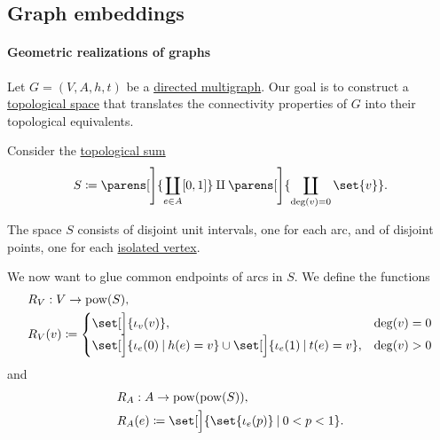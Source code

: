 \subsection{Graph embeddings}\label{subsec:graph_embeddings}

\paragraph{Geometric realizations of graphs}

\begin{definition}\label{def:graph_geometric_realization}\mimprovised
  Let \( G = (V, A, h, t) \) be a \hyperref[def:directed_multigraph]{directed multigraph}. Our goal is to construct a \hyperref[def:topological_space]{topological space} that translates the connectivity properties of \( G \) into their topological equivalents.

  Consider the \hyperref[def:topological_sum]{topological sum}
  \begin{equation*}
    S \coloneqq \parens[\Bigg]{ \coprod_{e \in A} [0, 1] } \amalg \parens[\Bigg]{ \coprod_{\deg(v) = 0} \set{ v } }.
  \end{equation*}

  The space \( S \) consists of disjoint unit intervals, one for each arc, and of disjoint points, one for each \hyperref[def:graph_cardinality/directed_degree]{isolated vertex}.

  We now want to glue common endpoints of arcs in \( S \). We define the functions
  \begin{equation}\label{eq:def:graph_geometric_realization/rv}
    \begin{aligned}
      &R_V: V \to \pow(S), \\
      &R_V(v) \coloneqq \begin{cases}
        \set[\Big]{ \iota_v(v) },                                                               &\deg(v) = 0 \\
        \set[\Big]{ \iota_e(0) \given h(e) = v } \cup \set[\Big]{ \iota_e(1) \given t(e) = v }, &\deg(v) > 0
      \end{cases}
    \end{aligned}
  \end{equation}
  and
  \begin{equation}\label{eq:def:graph_geometric_realization/ra}
    \begin{aligned}
      &R_A: A \to \pow(\pow(S)), \\
      &R_A(e) \coloneqq \set[\Big]{ \set{ \iota_e(p) } \given 0 < p < 1 }.
    \end{aligned}
  \end{equation}


\end{definition}
